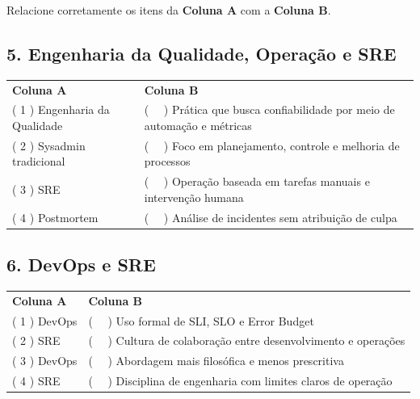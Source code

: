 \documentclass[12pt]{article}
\begin{document}
\vspace{0.3cm}


Relacione corretamente os itens da \textbf{Coluna A} com a \textbf{Coluna B}.

\vspace{0.3cm}

\subsection*{5. Engenharia da Qualidade, Operação e SRE}

\noindent
\begin{tabular}{p{6cm} p{8cm}}
\textbf{Coluna A} & \textbf{Coluna B} \\[0.2cm]
( 1 ) Engenharia da Qualidade & ( \ \ ) Prática que busca confiabilidade por meio de automação e métricas \\
( 2 ) Sysadmin tradicional & ( \ \ ) Foco em planejamento, controle e melhoria de processos \\
( 3 ) SRE & ( \ \ ) Operação baseada em tarefas manuais e intervenção humana \\
( 4 ) Postmortem & ( \ \ ) Análise de incidentes sem atribuição de culpa \\
\end{tabular}

\vspace{0.6cm}

\subsection*{6. DevOps e SRE}

\noindent
\begin{tabular}{p{6cm} p{8cm}}
\textbf{Coluna A} & \textbf{Coluna B} \\[0.2cm]
( 1 ) DevOps & ( \ \ ) Uso formal de SLI, SLO e Error Budget \\
( 2 ) SRE & ( \ \ ) Cultura de colaboração entre desenvolvimento e operações \\
( 3 ) DevOps & ( \ \ ) Abordagem mais filosófica e menos prescritiva \\
( 4 ) SRE & ( \ \ ) Disciplina de engenharia com limites claros de operação \\
\end{tabular}

\vspace{0.8cm}


\end{document}
